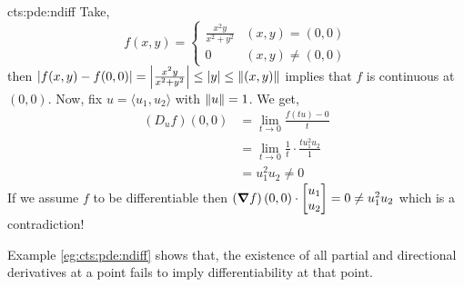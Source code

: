 \documentclass[../Analysis-3.tex]{subfiles}
\begin{document}
\begin{Eg}{}{cts:pde:ndiff}
  Take,
  \[ f(x,y) = \begin{cases}
      \frac{x^2y}{x^2+y^2} & (x,y) = (0,0)      \\
      0                    & (x,y) \not= (0,0)
    \end{cases} \]
  then $ \left| f(x,y) - f(0,0) \right| = \left| \frac{x^2y}{x^2+y^2} \right| \leq |y| \leq \norm{(x,y)} $ implies that $ f $ is continuous at $ (0,0) $. Now, fix $ u = \langle u_1, u_2 \rangle $ with $ \norm{u} = 1 $. We get,
  \begin{align*}
    \left( D_uf \right)(0,0)
     & = \lim_{t\to 0} \frac{f(tu)- 0}{t}                        \\
     & =\lim_{t\to 0} \frac{1}{t}\cdot\frac{tu_1^2u_2}{1}        \\
     & = u_1^2u_2 \not= 0 \tag{Because, $ u $ is an unit vector}
  \end{align*}
  If we assume $ f $ to be differentiable then $ \left( \grad f \right)(0,0) \cdot \begin{bmatrix} u_1 \\ u_2  \end{bmatrix} = 0 \not= u_1^2u_2 $ which is a contradiction!
\end{Eg}

Example \ref{eg:cts:pde:ndiff} shows that, the existence of all partial and directional derivatives at a point fails to imply differentiability at that point.
\end{document}
